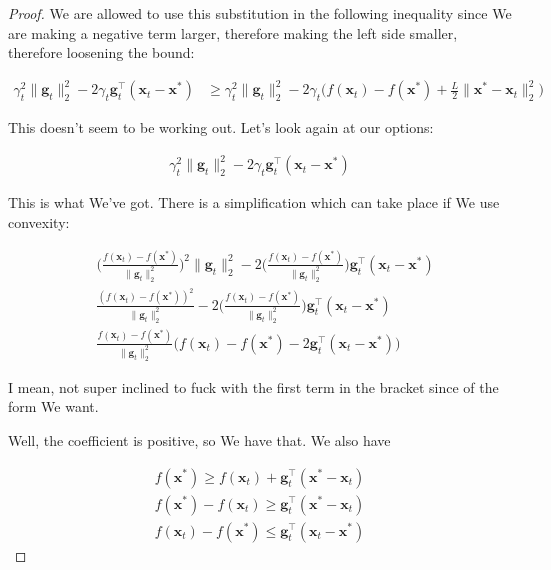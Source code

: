 \documentclass{article}
\begin{document}
\begin{proof}
	We are allowed to use this substitution in the following inequality since We are making a negative term larger, therefore making the left side smaller, therefore loosening the bound:
	
		\begin{align}
		\gamma_t^2\|\mathbf{g}_t\|^2_2 - 2 \gamma_t\mathbf{g}^\top_t(\mathbf{x}_t - \mathbf{x}^*) &\ge \gamma_t^2\|\mathbf{g}_t\|^2_2  -2\gamma_t\bigg( f(\mathbf{x}_t) - f(\mathbf{x}^*)  + \frac{L}{2}\|\mathbf{x}^* - \mathbf{x}_t\|^2_2 \bigg) 
	\end{align}
	
	This doesn't seem to be working out. Let's look again at our options:
	
	\begin{align}
		\gamma_t^2\|\mathbf{g}_t\|^2_2 - 2 \gamma_t\mathbf{g}^\top_t(\mathbf{x}_t - \mathbf{x}^*)
	\end{align}
	
	This is what We've got. There is a simplification which can take place if We use convexity:
	
	\begin{align}
		&\bigg(\frac{f(\mathbf{x}_t) - f(\mathbf{x}^*)}{\|\mathbf{g}_t\|^2_2} \bigg)^2\|\mathbf{g}_t\|^2_2 - 2\bigg(\frac{f(\mathbf{x}_t) - f(\mathbf{x}^*)}{\|\mathbf{g}_t\|^2_2} \bigg)\mathbf{g}^\top_t(\mathbf{x}_t - \mathbf{x}^*)\\
		&\frac{(f(\mathbf{x}_t) - f(\mathbf{x}^*))^2}{\|\mathbf{g}_t\|^2_2} - 2\bigg(\frac{f(\mathbf{x}_t) - f(\mathbf{x}^*)}{\|\mathbf{g}_t\|^2_2} \bigg)\mathbf{g}^\top_t(\mathbf{x}_t - \mathbf{x}^*)\\
		& \frac{f(\mathbf{x}_t) - f(\mathbf{x}^*)}{\|\mathbf{g}_t\|^2_2} \bigg(f(\mathbf{x}_t) - f(\mathbf{x}^*) - 2\mathbf{g}^\top_t(\mathbf{x}_t - \mathbf{x}^*)\bigg)
	\end{align}
	
	I mean, not super inclined to fuck with the first term in the bracket since of the form We want.
	
	Well, the coefficient is positive, so We have that. We also have
	
	\begin{align}
		f(\mathbf{x}^*) \ge f(\mathbf{x}_t) + \mathbf{g}_t^\top(\mathbf{x}^* - \mathbf{x}_t)\\
		f(\mathbf{x}^*) - f(\mathbf{x}_t) \ge \mathbf{g}_t^\top(\mathbf{x}^* - \mathbf{x}_t)\\
		f(\mathbf{x}_t) - f(\mathbf{x}^*)  \le \mathbf{g}_t^\top(\mathbf{x}_t - \mathbf{x}^*)
	\end{align}
	

\end{proof}
\end{document}
